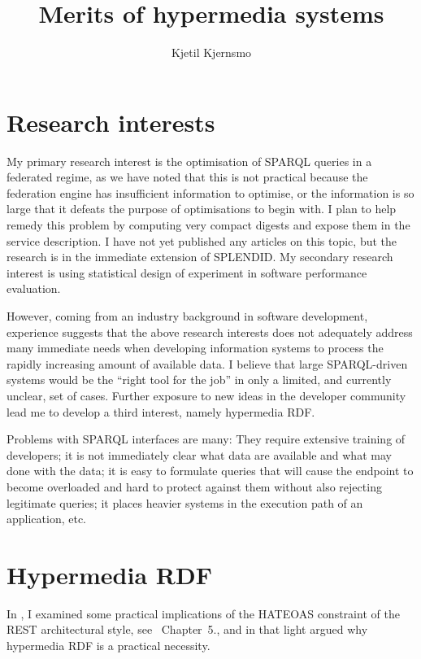 \documentclass{article}
\title{Merits of hypermedia systems}
\author{Kjetil Kjernsmo}
\begin{document}
\maketitle

\section{Research interests}

My primary research interest is the optimisation of SPARQL queries in
a federated regime, as we have noted that this is not practical
because the federation engine has insufficient information to
optimise, or the information is so large that it defeats the purpose
of optimisations to begin with. I plan to help remedy this problem by
computing very compact digests and expose them in the service
description. I have not yet published any articles on this topic, but
the research is in the immediate extension of
SPLENDID\cite{splendid}. My secondary research interest is using statistical design of
experiment in software performance evaluation.

However, coming from an industry background in software development,
experience suggests that the above research interests does not
adequately address many immediate needs when developing information
systems to process the rapidly increasing amount of available data. I
believe that large SPARQL-driven systems would be the ``right tool for
the job'' in only a limited, and currently unclear, set of
cases. Further exposure to new ideas in the developer community lead
me to develop a third interest, namely hypermedia RDF. 

Problems with SPARQL interfaces are many: They require extensive
training of developers; it is not immediately clear what data are
available and what may done with the data; it is easy to formulate
queries that will cause the endpoint to become overloaded and hard to
protect against them without also rejecting legitimate queries; it
places heavier systems in the execution path of an application, etc.

\section{Hypermedia RDF}

In \cite{kjernsmo_lapis_2012}, I examined some practical implications of
the HATEOAS constraint of the REST architectural style, see
\cite{Fielding_2000_Architectural-Styles}~Chapter~5., and in that
light argued why hypermedia RDF is a practical necessity.
\end{document}

